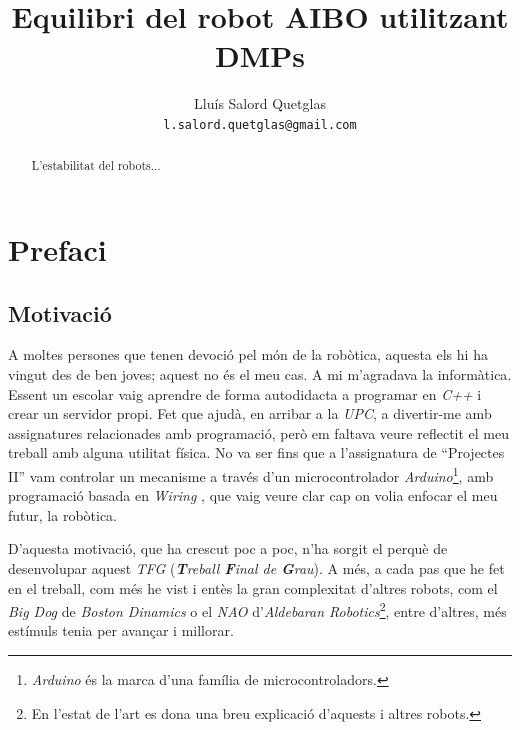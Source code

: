 \documentclass[12pt,a4paper,final,twoside]{report}
\title{Equilibri del robot AIBO utilitzant DMPs}
\author{Lluís Salord Quetglas\\
		\texttt{l.salord.quetglas@gmail.com}\\}
\date{Escola Tècnica Superior d'Enginyeria Industrial\\
Treball Final de Grau\\
Grau en Enginyeria en Tecnologies Industrials\\
\paragraph{}
\today} %
\begin{document}
\maketitle
\thispagestyle{empty}

\cleardoublepage

\setcounter{page}{1} %

\begin{abstract}
L'estabilitat del robots...
\end{abstract}


\tableofcontents
\newpage
\listoffigures
\newpage
\listoftables
\newpage



\chapter*{Prefaci}
\label{Prefaci}


\section*{Motivació}
\label{Motivacio}

A moltes persones que tenen devoció pel món de la robòtica, aquesta els hi ha vingut des de ben joves; aquest no és el meu cas. A mi m'agradava la informàtica. Essent un escolar vaig aprendre de forma autodidacta a programar en \textit{C++} i crear un servidor propi. Fet que ajudà, en arribar a la \textit{UPC}, a divertir-me amb assignatures relacionades amb programació, però em faltava veure reflectit el meu treball amb alguna utilitat física. No va ser fins que a l'assignatura de ``Projectes II'' vam controlar un mecanisme a través d'un microcontrolador \textit{Arduino}\footnote{\textit{Arduino} és la marca d'una família de microcontroladors.}, amb programació basada en \textit{Wiring} \cite{Arduino}, que vaig veure clar cap on volia enfocar el meu futur, la robòtica.

D'aquesta motivació, que ha crescut poc a poc, n'ha sorgit el perquè de desenvolupar aquest \textit{TFG} (\textit{\textbf{T}reball \textbf{F}inal de \textbf{G}rau}). A més, a cada pas que he fet en el treball, com més he vist i entès la gran complexitat d'altres robots, com el \textit{Big Dog} de \textit{Boston Dinamics} o el \textit{NAO} d'\textit{Aldebaran Robotics}\footnote{En l'estat de l'art es dona una breu explicació d'aquests i altres robots.}, entre d'altres, més estímuls tenia per avançar i millorar.
\end{document}

